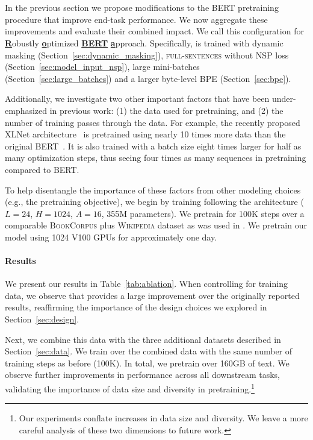 \section{\ourmodel{}} \label{sec:roberta}



In the previous section we propose modifications to the BERT pretraining procedure that improve end-task performance.
We now aggregate these improvements and evaluate their combined impact.
We call this configuration \textbf{\ourmodel{}} for \underline{\textbf{R}}obustly \underline{\textbf{o}}ptimized \underline{\textbf{BERT}} \underline{\textbf{a}}pproach.
Specifically, \ourmodel{} is trained with dynamic masking (Section~\ref{sec:dynamic_masking}), \textsc{full-sentences} without NSP loss (Section~\ref{sec:model_input_nsp}), large mini-batches (Section~\ref{sec:large_batches}) and a larger byte-level BPE (Section~\ref{sec:bpe}).

Additionally, we investigate two other important factors that have been under-emphasized in previous work: (1) the data used for pretraining, and (2) the number of training passes through the data.
For example, the recently proposed XLNet architecture~\cite{yang2019xlnet} is pretrained using nearly 10 times more data than the original BERT~\cite{devlin2018bert}.
It is also trained with a batch size eight times larger for half as many optimization steps, thus seeing four times as many sequences in pretraining compared to BERT.

To help disentangle the importance of these factors from other modeling choices (e.g., the pretraining objective), we begin by training \ourmodel{} following the \bertlarge{} architecture ($L=24$, $H=1024$, $A=16$, 355M parameters).
We pretrain for 100K steps over a comparable \textsc{BookCorpus} plus \textsc{Wikipedia} dataset as was used in .
We pretrain our model using 1024 V100 GPUs for approximately one day.

\paragraph{Results}

We present our results in Table~\ref{tab:ablation}.
When controlling for training data, we observe that \ourmodel{} provides a large improvement over the originally reported \bertlarge{} results, reaffirming the importance of the design choices we explored in Section~\ref{sec:design}.

Next, we combine this data with the three additional datasets described in Section~\ref{sec:data}.
We train \ourmodel{} over the combined data with the same number of training steps as before (100K).
In total, we pretrain over 160GB of text.
We observe further improvements in performance across all downstream tasks, validating the importance of data size and diversity in pretraining.\footnote{Our experiments conflate increases in data size and diversity. We leave a more careful analysis of these two dimensions to future work.}

